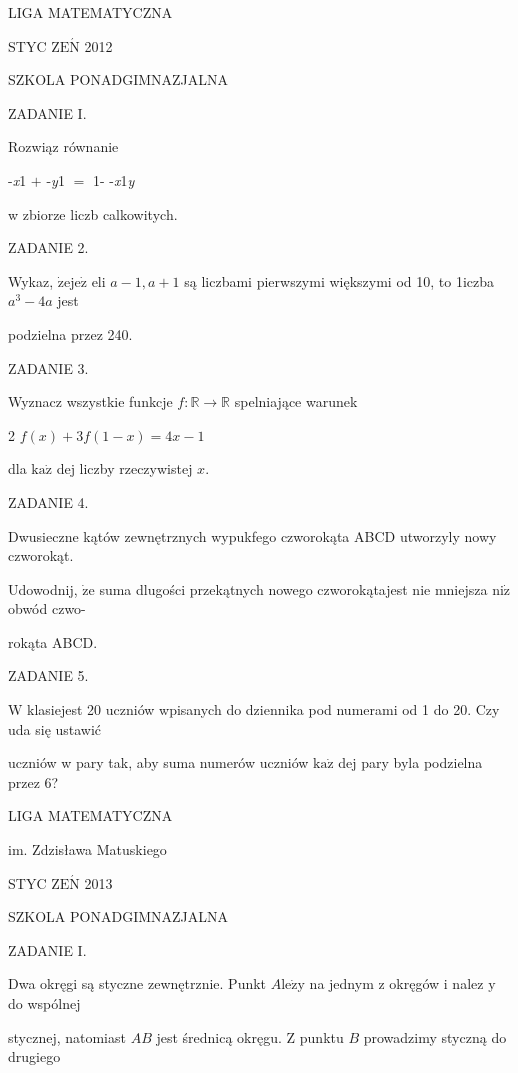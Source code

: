 \documentclass[a4paper,12pt]{article}
\begin{document}
LIGA MATEMATYCZNA

STYC Z$\mathrm{E}\acute{\mathrm{N}}$ 2012

SZKOLA PONADGIMNAZJALNA

ZADANIE I.

Rozwiąz równanie

-{\it x}1 $+$ -{\it y}1 $=$ 1- -{\it x}1{\it y}

w zbiorze liczb calkowitych.

ZADANIE 2.

Wykaz, $\dot{\mathrm{z}}\mathrm{e}\mathrm{j}\mathrm{e}\dot{\mathrm{z}}$ eli $a-1, a+1$ są liczbami pierwszymi większymi od 10, to 1iczba $a^{3}-4a$ jest

podzielna przez 240.

ZADANIE 3.

Wyznacz wszystkie funkcje $f:\mathbb{R}\rightarrow \mathbb{R}$ spelniające warunek

2 $f(x)+3f(1-x)=4x-1$

dla $\mathrm{k}\mathrm{a}\dot{\mathrm{z}}$ dej liczby rzeczywistej $x.$

ZADANIE 4.

Dwusieczne kątów zewnętrznych wypukfego czworokąta ABCD utworzyly nowy czworokąt.

Udowodnij, $\dot{\mathrm{z}}\mathrm{e}$ suma dlugości przekątnych nowego czworokątajest nie mniejsza $\mathrm{n}\mathrm{i}\dot{\mathrm{z}}$ obwód czwo-

rokąta ABCD.

ZADANIE 5.

$\mathrm{W}$ klasiejest 20 uczniów wpisanych do dziennika pod numerami od 1 do 20. Czy uda się ustawić

uczniów w pary tak, aby suma numerów uczniów $\mathrm{k}\mathrm{a}\dot{\mathrm{z}}$ dej pary byla podzielna przez 6?






LIGA MATEMATYCZNA

im. Zdzisława Matuskiego

STYC Z$\mathrm{E}\acute{\mathrm{N}}$ 2013

SZKOLA PONADGIMNAZJALNA

ZADANIE I.

Dwa okręgi są styczne zewnętrznie. Punkt $A\mathrm{l}\mathrm{e}\dot{\mathrm{z}}\mathrm{y}$ na jednym z okręgów i nalez $\mathrm{y}$ do wspólnej

stycznej, natomiast $AB$ jest średnicą okręgu. $\mathrm{Z}$ punktu $B$ prowadzimy styczną do drugiego
\end{document}
